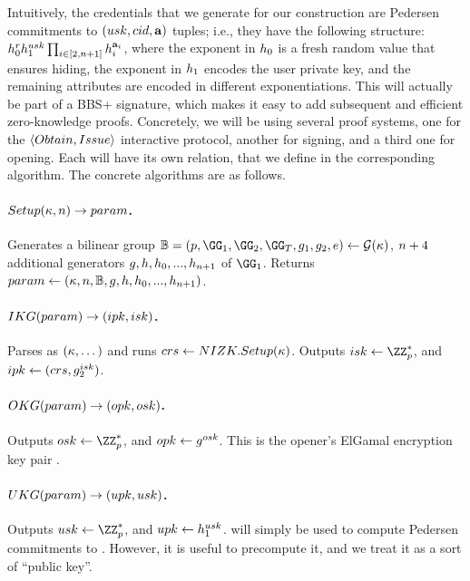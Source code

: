 Intuitively, the credentials that we generate for our \GSAC construction are
Pedersen commitments to $(usk,cid,\mathbf{a})$ tuples; i.e., they have
the following structure: $h_0^rh_1^{usk}\prod_{i \in [2,n+1]}
h_i^{\mathbf{a}_i}$, where the exponent in $h_0$ is a fresh random value
that ensures hiding, the exponent in $h_1$ encodes the user private
key, and the remaining attributes are encoded in different
exponentiations. This will actually be part of a BBS+ signature, which makes it
easy to add subsequent and efficient zero-knowledge proofs. Concretely, we will
be using several \NIZK proof systems, one for the $\langle Obtain,Issue
\rangle$ interactive protocol, another for signing, and a third one for opening.
Each will have its own relation, that we define in the corresponding algorithm.
The concrete algorithms are as follows.

\paragraph{$Setup(\kappa,n) \rightarrow param$.} %
Generates a bilinear group $\BB = (p,\GG_1,\GG_2,\GG_T,\gen{g}_1,\gen{g}_2,e) \gets
\PGen(\secpar)$, $n+4$ additional generators $g,h,h_0,...,
h_{n+1}$ of $\GG_1$. Returns $param \gets
(\kappa,n,\mathbb{B},g,h,h_0,...,h_{n+1})$.

\paragraph{$IKG(param) \rightarrow (ipk,isk)$.} %
Parses \parm as $(\kappa,\dots)$ and runs $crs \gets NIZK.Setup(\kappa)$.
Outputs $\isk \gets \ZZ^*_p$, and $ipk \gets (crs,g_2^{isk})$.

\paragraph{$OKG(param) \rightarrow (opk,osk)$.} %
Outputs $\osk \gets \ZZ^*_p$, and $opk \gets g^{osk}$. This is the
opener's ElGamal encryption key pair \needcite.

\paragraph{$UKG(param) \rightarrow (upk,usk)$.} %
Outputs $\usk \gets \ZZ^*_p$, and $upk \gets h_1^{usk}$. \upk will
simply be used to compute Pedersen commitments \needcite to \usk. However,
it is useful to precompute it, and we treat it as a sort of ``public key''.

